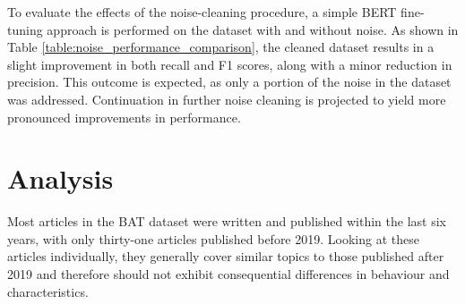 To evaluate the effects of the noise-cleaning procedure, a simple BERT fine-tuning approach is performed on the dataset with and without noise. As shown in Table \ref{table:noise_performance_comparison}, the cleaned dataset results in a slight improvement in both recall and F1 scores, along with a minor reduction in precision. This outcome is expected, as only a portion of the noise in the dataset was addressed. Continuation in further noise cleaning is projected to yield more pronounced improvements in performance.


\section{Analysis}

Most articles in the BAT dataset were written and published within the last six years, with only thirty-one articles published before 2019. Looking at these articles individually, they generally cover similar topics to those published after 2019 and therefore should not exhibit consequential differences in behaviour and characteristics.

